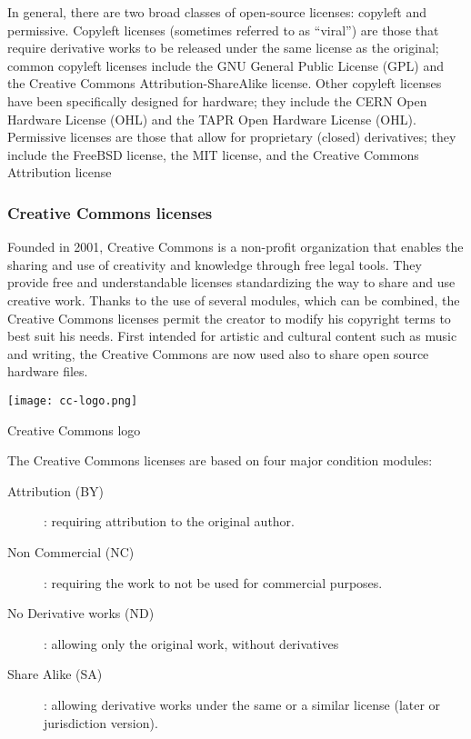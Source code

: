 In general, there are two broad classes of open-source licenses: copyleft and permissive. Copyleft licenses (sometimes referred to as “viral”) are those that require derivative works to be released under the same license as the original; common copyleft licenses include the GNU General Public License (GPL) and the Creative Commons Attribution-ShareAlike license. Other copyleft licenses have been specifically designed for hardware; they include the CERN Open Hardware License (OHL) and the TAPR Open Hardware License (OHL). Permissive licenses are those that allow for proprietary (closed) derivatives; they include the FreeBSD license, the MIT license, and the Creative Commons Attribution license


\subsubsection{Creative Commons licenses} %
\begin{row}{4}{2}
    \begin{cell}{3}
        Founded in 2001, Creative Commons is a non-profit organization that enables the sharing and use of creativity and knowledge through free legal tools. They provide free and understandable licenses standardizing the way to share and use creative work. Thanks to the use of several modules, which can be combined, the Creative Commons licenses permit the creator to modify his copyright terms to best suit his needs. First intended for artistic and cultural content such as music and writing, the Creative Commons are now used also to share open source hardware files.
    \end{cell}
    \begin{cell}{1}
        \begin{NFfigure}
            \centering
                \texttt{[image: cc-logo.png]}
            \caption{Creative Commons logo}
            \label{fig:cc_logo}
        \end{NFfigure}
    \end{cell}
\end{row}
The Creative Commons licenses are based on four major condition modules:
\begin{description}
    \item[Attribution (BY)]: requiring attribution to the original author.
    \item[Non Commercial (NC)]: requiring the work to not be used for commercial purposes.
    \item[No Derivative works (ND)]: allowing only the original work, without derivatives
    \item[Share Alike (SA)]: allowing derivative works under the same or a similar license (later or jurisdiction version).
\end{description}


